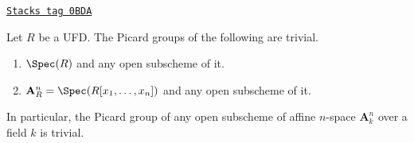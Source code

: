 \begin{lemma}
\label{divisors-lemma-open-subscheme-UFD}
\href{https://stacks.math.columbia.edu/tag/0BDA}{\texttt{Stacks tag 0BDA}}

Let $R$ be a UFD. The Picard groups of the following are
trivial.
\begin{enumerate}
\item $\Spec(R)$ and any open subscheme of it.
\item $\mathbf{A}^n_R = \Spec(R[x_1, \ldots, x_n])$ and any open subscheme
of it.
\end{enumerate}
In particular, the Picard group of any open subscheme of affine
$n$-space $\mathbf{A}^n_k$ over a field $k$ is trivial.
\end{lemma}

